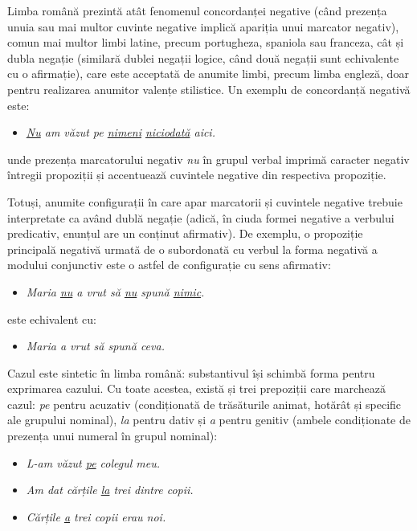\begin{multicols}{2}
Limba română prezintă atât fenomenul concordanței negative (când prezența unuia sau mai multor cuvinte negative implică apariția unui marcator negativ), comun mai multor limbi latine, precum portugheza, spaniola sau franceza, cât și dubla negație (similară dublei negații logice, când două negații sunt echivalente cu o afirmație), care este acceptată de anumite limbi, precum limba engleză, doar pentru realizarea anumitor valențe stilistice. 
Un exemplu de concordanță negativă este:

\begin{itemize}
\item\textit{\underline{Nu} am văzut pe \underline{nimeni} \underline{niciodată} aici.}
\end{itemize}

unde prezența marcatorului negativ \textit{nu} în grupul verbal imprimă caracter negativ întregii propoziții și accentuează cuvintele negative din respectiva propoziție. 

Totuși, anumite configurații în care apar marcatorii și cuvintele negative trebuie interpretate ca având dublă negație (adică, în ciuda formei negative a verbului predicativ, enunțul are un conținut afirmativ). De exemplu, o propoziție principală negativă urmată de o subordonată cu verbul la forma negativă a modului conjunctiv este o astfel de configurație cu sens afirmativ: 

\begin{itemize}
\item\textit{Maria \underline{nu} a vrut să \underline{nu} spună \underline{nimic}.}
\end{itemize}

este echivalent cu: 

\begin{itemize}
\item\textit{Maria a vrut să spună ceva.}
\end{itemize}

Cazul este sintetic în limba română: substantivul își schimbă forma pentru exprimarea cazului. Cu toate acestea, există și trei prepoziții care marchează cazul: \textit{pe} pentru acuzativ (condiționată de trăsăturile animat, hotărât și specific ale grupului nominal), \textit{la} pentru dativ și \textit{a} pentru genitiv (ambele condiționate de prezența unui numeral în grupul nominal):

\begin{itemize}
\item \textit{L-am văzut \underline{pe} colegul meu.}
\item \textit{Am dat cărțile \underline{la} trei dintre copii.}
\item \textit{Cărțile \underline{a} trei copii erau noi.}
\end{itemize}


\end{multicols}
